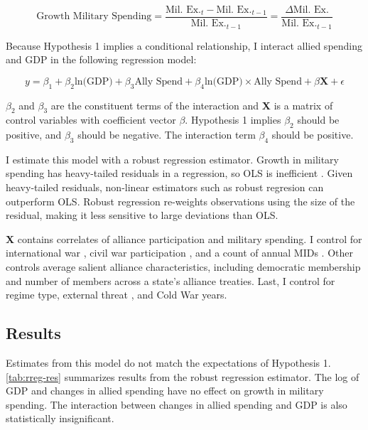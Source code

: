 \documentclass[12pt]{article}
\begin{document}
\begin{equation}
\mbox{Growth Military Spending} = \frac{\mbox{Mil. Ex.}_t - \mbox{Mil. Ex.}_{t-1} }{ \mbox{Mil. Ex.}_{t-1} } = \frac{\Delta \mbox{Mil. Ex.} }{ \mbox{Mil. Ex.}_{t-1} }
\end{equation} 


Because Hypothesis 1 implies a conditional relationship, I interact allied spending and GDP in the following regression model:

\begin{equation} 
y = \beta_1 + \beta_2 \mbox{ln(GDP)} + \beta_3 \mbox{Ally Spend} + \beta_4 \mbox{ln(GDP)} \times \mbox{Ally Spend} + \beta \mathbf{X} + \epsilon
\end{equation}


$\beta_2$ and $\beta_3$ are the constituent terms of the interaction and \textbf{X} is a matrix of control variables with coefficient vector $\beta$.
Hypothesis 1 implies $\beta_2$ should be positive, and $\beta_3$ should be negative. 
The interaction term $\beta_4$ should be positive. 


I estimate this model with a robust regression estimator. 
Growth in military spending has heavy-tailed residuals in a regression, so OLS is inefficient \citep{RaineyBaissa2018}. 
Given heavy-tailed residuals, non-linear estimators such as robust regresion can outperform OLS. 
Robust regression re-weights observations using the size of the residual, making it less sensitive to large deviations than OLS. 


\textbf{X} contains correlates of alliance participation and military spending. 
I control for international war \citep{Reiteretal2016}, civil war participation \citep{SarkeesWayman2010}, and a count of annual MIDs \citep{Gibleretal2016}. 
Other controls average salient alliance characteristics, including democratic membership \citep{DigiuseppePoast2016} and number of members across a state's alliance treaties.   
Last, I control for regime type, external threat \citep{LeedsSavun2007}, and Cold War years. 


\subsection{Results}


Estimates from this model do not match the expectations of Hypothesis 1. 
\autoref{tab:rreg-res} summarizes results from the robust regression estimator. 
The log of GDP and changes in allied spending have no effect on growth in military spending. 
The interaction between changes in allied spending and GDP is also statistically insignificant. 
\end{document}
